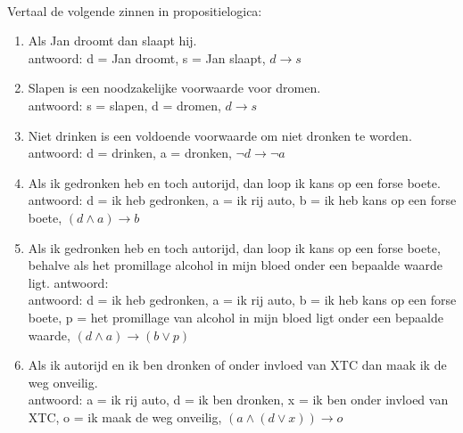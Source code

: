 \begin{answer}[Vertalen]\mbox{}\\ %
Vertaal de volgende zinnen in propositielogica:
\begin{enumerate}[label=\textit{\alph*.}]
\item Als Jan droomt dan slaapt hij.\\
antwoord: d = Jan droomt, s = Jan slaapt, $d \rightarrow s$
\item Slapen is een noodzakelijke voorwaarde voor dromen.\\
antwoord: s = slapen, d = dromen, $d \rightarrow s$
\item Niet drinken is een voldoende voorwaarde om niet dronken te worden.\\
antwoord: d = drinken, a = dronken, $\neg d \rightarrow \neg a$
\item Als ik gedronken heb en toch autorijd, dan loop ik kans op een forse boete.\\
antwoord: d = ik heb gedronken, a = ik rij auto, b = ik heb kans op een forse boete, $(d \land a) \rightarrow b$ 
\item Als ik gedronken heb en toch autorijd, dan loop ik kans op een forse boete, behalve als het promillage alcohol in mijn bloed onder een bepaalde waarde ligt.
antwoord:\\
antwoord: d = ik heb gedronken, a = ik rij auto, b = ik heb kans op een forse boete, p = het promillage van alcohol in mijn bloed ligt onder een bepaalde waarde, $(d \land a) \rightarrow (b \lor p)$
\item Als ik autorijd en ik ben dronken of onder invloed van XTC dan maak ik de weg onveilig.\\
antwoord: a = ik rij auto, d = ik ben dronken, x = ik ben onder invloed van XTC, o = ik maak de weg onveilig, $(a \land (d \lor x)) \rightarrow o$
\end{enumerate}
\end{answer}

